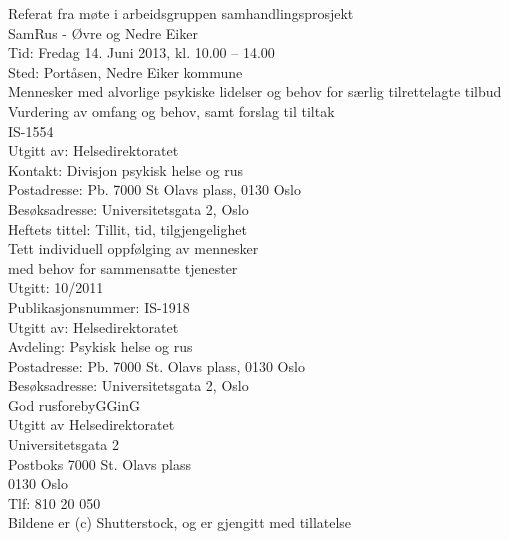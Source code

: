 \documentclass[11pt]{report} %
\begin{document}
\begin{thebibliography}{99}
                  Referat fra møte i arbeidsgruppen samhandlingsprosjekt\\ 
                  SamRus - Øvre og Nedre Eiker\\
                  Tid: Fredag 14. Juni 2013,  kl. 10.00 – 14.00\\
                  Sted: Portåsen, Nedre Eiker kommune\\

                  Mennesker med alvorlige psykiske lidelser og behov for særlig tilrettelagte tilbud Vurdering av omfang og behov, samt forslag til tiltak\\
                  IS-1554\\
                  Utgitt av: Helsedirektoratet\\
                  Kontakt: Divisjon psykisk helse og rus\\
                  Postadresse: Pb. 7000 St Olavs plass, 0130 Oslo\\
                  Besøksadresse: Universitetsgata 2, Oslo\\

                  Heftets tittel: Tillit, tid, tilgjengelighet\\
                  Tett individuell oppfølging av mennesker\\
                  med behov for sammensatte tjenester\\
                  Utgitt: 10/2011\\
                  Publikasjonsnummer: IS-1918\\
                  Utgitt av: Helsedirektoratet\\
                  Avdeling: Psykisk helse og rus\\
                  Postadresse: Pb. 7000 St. Olavs plass, 0130 Oslo\\
                  Besøksadresse: Universitetsgata 2, Oslo\\

                  God rusforebyGGinG\\
                  Utgitt av Helsedirektoratet\\
                  Universitetsgata 2\\
                  Postboks 7000 St. Olavs plass\\
                  0130 Oslo\\
                  Tlf: 810 20 050\\

                  Bildene er (c) Shutterstock, og er gjengitt med tillatelse\\
  




              \end{thebibliography}

              \listoffigures

              
\end{document}
